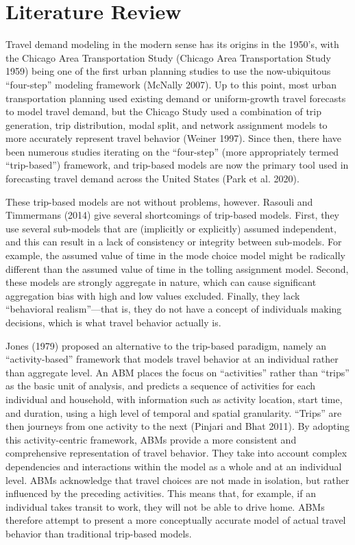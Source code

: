 \documentclass[fancy, twoside, mastersfancy, ms]{byuthesis}
\begin{document}
\chapter{Literature Review}\label{sec-literature}

Travel demand modeling in the modern sense has its origins in the
1950's, with the Chicago Area Transportation Study (Chicago Area
Transportation Study 1959) being one of the first urban planning studies
to use the now-ubiquitous ``four-step'' modeling framework (McNally
2007). Up to this point, most urban transportation planning used
existing demand or uniform-growth travel forecasts to model travel
demand, but the Chicago Study used a combination of trip generation,
trip distribution, modal split, and network assignment models to more
accurately represent travel behavior (Weiner 1997). Since then, there
have been numerous studies iterating on the ``four-step'' (more
appropriately termed ``trip-based'') framework, and trip-based models
are now the primary tool used in forecasting travel demand across the
United States (Park et al. 2020).

These trip-based models are not without problems, however. Rasouli and
Timmermans (2014) give several shortcomings of trip-based models. First,
they use several sub-models that are (implicitly or explicitly) assumed
independent, and this can result in a lack of consistency or integrity
between sub-models. For example, the assumed value of time in the mode
choice model might be radically different than the assumed value of time
in the tolling assignment model. Second, these models are strongly
aggregate in nature, which can cause significant aggregation bias with
high and low values excluded. Finally, they lack ``behavioral
realism''---that is, they do not have a concept of individuals making
decisions, which is what travel behavior actually is.

Jones (1979) proposed an alternative to the trip-based paradigm, namely
an ``activity-based'' framework that models travel behavior at an
individual rather than aggregate level. An ABM places the focus on
``activities'' rather than ``trips'' as the basic unit of analysis, and
predicts a sequence of activities for each individual and household,
with information such as activity location, start time, and duration,
using a high level of temporal and spatial granularity. ``Trips'' are
then journeys from one activity to the next (Pinjari and Bhat 2011). By
adopting this activity-centric framework, ABMs provide a more consistent
and comprehensive representation of travel behavior. They take into
account complex dependencies and interactions within the model as a
whole and at an individual level. ABMs acknowledge that travel choices
are not made in isolation, but rather influenced by the preceding
activities. This means that, for example, if an individual takes transit
to work, they will not be able to drive home. ABMs therefore attempt to
present a more conceptually accurate model of actual travel behavior
than traditional trip-based models.
\end{document}

